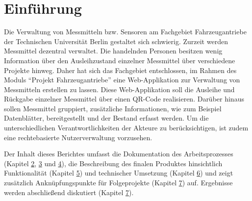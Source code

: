 \documentclass[
]{article}
\author{}
\date{\vspace{-2.5em}}
\begin{document}
\renewcommand*\contentsname{Inhaltsverzeichnis}
{
\setcounter{tocdepth}{2}
\tableofcontents
}
\renewcommand{\figurename}{Abbildung}
\renewcommand{\tablename}{Tabelle}
\renewcommand{\listfigurename}{Abbildungsverzeichnis}
\renewcommand{\listtablename}{Tabellenverzeichnis}
\renewcommand{\refname}{Literaturverzeichnis}


\newpage{}

\listoffigures
{}

\newpage{}

\listoftables
{}

\newpage{}


\hypertarget{introduction}{%
\section{Einführung}\label{introduction}}

Die Verwaltung von Messmitteln bzw. Sensoren am Fachgebiet Fahrzeugantriebe der Technischen Universität Berlin gestaltet sich schwierig. Zurzeit werden Messmittel dezentral verwaltet. Die handelnden Personen besitzen wenig Information über den Ausleihzustand einzelner Messmittel über verschiedene Projekte hinweg. Daher hat sich das Fachgebiet entschlossen, im Rahmen des Moduls ``Projekt Fahrzeugantriebe'' eine Web-Applikation zur Verwaltung von Messmitteln erstellen zu lassen. Diese Web-Applikation soll die Ausleihe und Rückgabe einzelner Messmittel über einen QR-Code realisieren. Darüber hinaus sollen Messmittel gruppiert, zusätzliche Informationen, wie zum Beispiel Datenblätter, bereitgestellt und der Bestand erfasst werden. Um die unterschiedlichen Verantwortlichkeiten der Akteure zu berücksichtigen, ist zudem eine rechtebasierte Nutzerverwaltung vorzusehen.

Der Inhalt dieses Berichtes umfasst die Dokumentation des Arbeitsprozesses (Kapitel \protect\hyperlink{requirements}{2}, \protect\hyperlink{tech-stack}{3} und \protect\hyperlink{workflow}{4}), die Beschreibung des finalen Produktes hinsichtlich Funktionalität (Kapitel \protect\hyperlink{user-guide}{5}) und technischer Umsetzung (Kapitel \protect\hyperlink{technical-guide}{6}) und zeigt zusätzlich Anknüpfungspunkte für Folgeprojekte (Kapitel \protect\hyperlink{discussion}{7}) auf. Ergebnisse werden abschließend diskutiert (Kapitel \protect\hyperlink{discussion}{7}).
\end{document}
